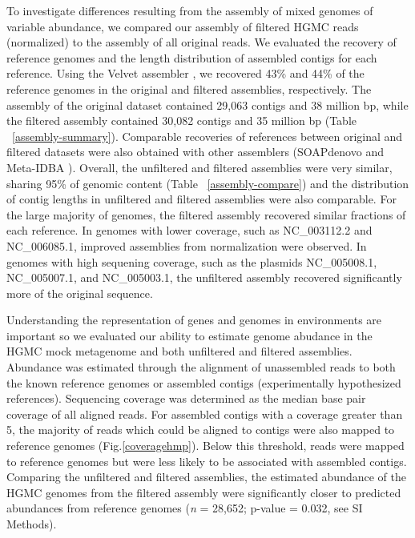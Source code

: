 \documentclass{pnastwo}
\begin{document}
\begin{article}
To investigate differences resulting from the assembly of mixed genomes of variable abundance, we compared our assembly of filtered HGMC reads (normalized) to the assembly of all original reads.  We evaluated the recovery of reference genomes and the length distribution of assembled contigs for each reference.  Using the Velvet assembler
\cite{Zerbino:2008p665}, we recovered 43\% and 44\% of the reference genomes in
the original and filtered assemblies, respectively. The assembly of the original
dataset contained 29,063 contigs and 38 million bp, while the filtered assembly
contained 30,082 contigs and 35 million bp (Table ~\ref{assembly-summary}).
Comparable recoveries of references between original and filtered datasets were
also obtained with other assemblers (SOAPdenovo \cite{Li:2010jz} and Meta-IDBA
\cite{Peng:2011p898}). Overall, the unfiltered and filtered assemblies were very
similar, sharing 95\% of genomic content (Table ~\ref{assembly-compare}) and the distribution
of contig lengths in unfiltered and filtered assemblies were also comparable. For the
large majority of genomes, the filtered assembly recovered similar fractions of each reference.  In genomes with lower coverage, such as NC\_003112.2 and NC\_006085.1, improved assemblies from normalization were observed.  In genomes with high sequening coverage, such as the plasmids  NC\_005008.1, NC\_005007.1, and NC\_005003.1, the unfiltered assembly recovered significantly more of the original sequence.   

Understanding the representation of genes and genomes in environments are important so we evaluated our ability to estimate genome abudance in the HGMC mock metagenome and both unfiltered and filtered assemblies. Abundance was estimated through
the alignment of unassembled reads to both the known reference genomes or assembled
contigs (experimentally hypothesized references). Sequencing coverage was determined as the median base pair coverage of
all aligned reads. For assembled contigs with a coverage greater than 5, the
majority of reads which could be aligned to contigs were also mapped to reference
genomes (Fig.\ref{coveragehmp}). Below this threshold, reads were mapped to reference
genomes but were less likely to be associated with assembled contigs. Comparing
the unfiltered and filtered assemblies, the estimated abundance of the HGMC
genomes from the filtered assembly were significantly closer to predicted
abundances from reference genomes (\emph{n} = 28,652; p-value = 0.032, see SI
Methods).


\end{article}
\end{document}
